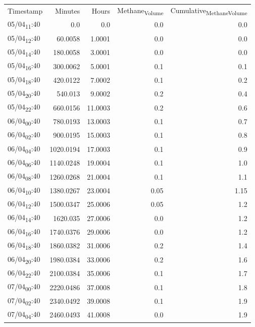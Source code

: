 \documentclass[11pt]{article}
\begin{document}
\begin{center}
\begin{tabular}{lrrrr}
Timestamp & Minutes & Hours & Methane\textsubscript{Volume} & Cumulative\textsubscript{Methane}\textsubscript{Volume}\\[0pt]
05/04\textsubscript{11}:40 & 0.0 & 0.0 & 0.0 & 0.0\\[0pt]
05/04\textsubscript{12}:40 & 60.0058 & 1.0001 & 0.0 & 0.0\\[0pt]
05/04\textsubscript{14}:40 & 180.0058 & 3.0001 & 0.0 & 0.0\\[0pt]
05/04\textsubscript{16}:40 & 300.0062 & 5.0001 & 0.1 & 0.1\\[0pt]
05/04\textsubscript{18}:40 & 420.0122 & 7.0002 & 0.1 & 0.2\\[0pt]
05/04\textsubscript{20}:40 & 540.013 & 9.0002 & 0.2 & 0.4\\[0pt]
05/04\textsubscript{22}:40 & 660.0156 & 11.0003 & 0.2 & 0.6\\[0pt]
06/04\textsubscript{00}:40 & 780.0193 & 13.0003 & 0.1 & 0.7\\[0pt]
06/04\textsubscript{02}:40 & 900.0195 & 15.0003 & 0.1 & 0.8\\[0pt]
06/04\textsubscript{04}:40 & 1020.0194 & 17.0003 & 0.1 & 0.9\\[0pt]
06/04\textsubscript{06}:40 & 1140.0248 & 19.0004 & 0.1 & 1.0\\[0pt]
06/04\textsubscript{08}:40 & 1260.0268 & 21.0004 & 0.1 & 1.1\\[0pt]
06/04\textsubscript{10}:40 & 1380.0267 & 23.0004 & 0.05 & 1.15\\[0pt]
06/04\textsubscript{12}:40 & 1500.0347 & 25.0006 & 0.05 & 1.2\\[0pt]
06/04\textsubscript{14}:40 & 1620.035 & 27.0006 & 0.0 & 1.2\\[0pt]
06/04\textsubscript{16}:40 & 1740.0376 & 29.0006 & 0.0 & 1.2\\[0pt]
06/04\textsubscript{18}:40 & 1860.0382 & 31.0006 & 0.2 & 1.4\\[0pt]
06/04\textsubscript{20}:40 & 1980.0384 & 33.0006 & 0.2 & 1.6\\[0pt]
06/04\textsubscript{22}:40 & 2100.0384 & 35.0006 & 0.1 & 1.7\\[0pt]
07/04\textsubscript{00}:40 & 2220.0486 & 37.0008 & 0.1 & 1.8\\[0pt]
07/04\textsubscript{02}:40 & 2340.0492 & 39.0008 & 0.1 & 1.9\\[0pt]
07/04\textsubscript{04}:40 & 2460.0493 & 41.0008 & 0.0 & 1.9\\[0pt]

\end{tabular}
\end{center}
\end{document}
